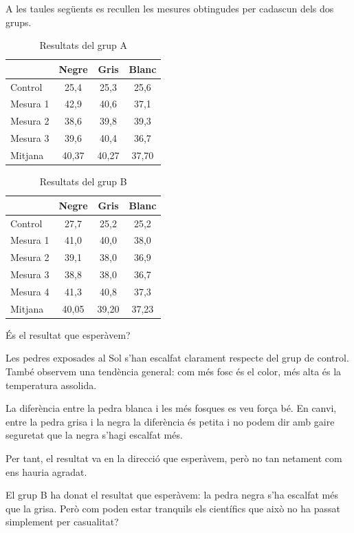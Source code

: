 A les taules següents es recullen les mesures obtingudes per cadascun dels dos grups.

\begin{table}[h]
\centering
\caption{Resultats del grup A}
\begin{tabular}{lccc}
\hline
 & \textbf{Negre} & \textbf{Gris} & \textbf{Blanc} \\
\hline
Control  & 25,4 & 25,3 & 25,6 \\
Mesura 1 & 42,9 & 40,6 & 37,1 \\
Mesura 2 & 38,6 & 39,8 & 39,3 \\
Mesura 3 & 39,6 & 40,4 & 36,7 \\
\hline
Mitjana  & 40,37 & 40,27 & 37,70 \\
\hline
\end{tabular}
\end{table}

\begin{table}[h]
\centering
\caption{Resultats del grup B}
\begin{tabular}{lccc}
\hline
 & \textbf{Negre} & \textbf{Gris} & \textbf{Blanc} \\
\hline
Control  & 27,7 & 25,2 & 25,2 \\
Mesura 1 & 41,0 & 40,0 & 38,0 \\
Mesura 2 & 39,1 & 38,0 & 36,9 \\
Mesura 3 & 38,8 & 38,0 & 36,7 \\
Mesura 4 & 41,3 & 40,8 & 37,3 \\
\hline
Mitjana  & 40,05 & 39,20 & 37,23 \\
\hline
\end{tabular}
\end{table}

És el resultat que esperàvem?

Les pedres exposades al Sol s’han escalfat clarament respecte del grup de control. També observem una tendència general: com més fosc és el color, més alta és la temperatura assolida.

La diferència entre la pedra blanca i les més fosques es veu força bé. En canvi, entre la pedra grisa i la negra la diferència és petita i no podem dir amb gaire seguretat que la negra s’hagi escalfat més.

Per tant, el resultat va en la direcció que esperàvem, però no tan netament com ens hauria agradat.

El grup B ha donat el resultat que esperàvem: la pedra negra s’ha escalfat més que la grisa. Però com poden estar tranquils els científics que això no ha passat simplement per casualitat?

